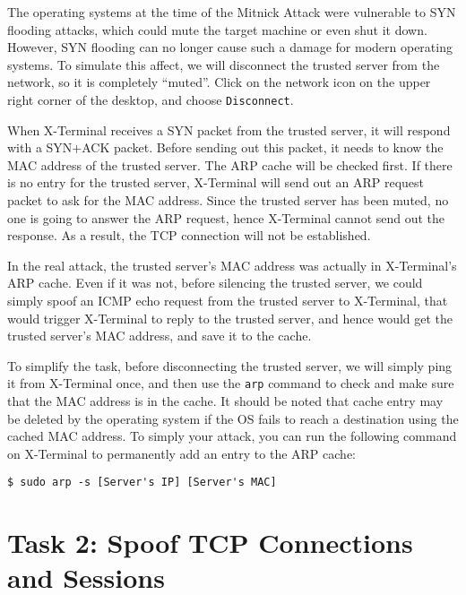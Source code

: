 The operating systems at the time of the Mitnick Attack were vulnerable to SYN
flooding attacks, which could mute the target machine or even shut it down. 
However, SYN flooding can no longer cause such a damage for modern operating systems. 
To simulate this affect, we will
disconnect the trusted server from the network, so it is completely ``muted''.
Click on the network icon on the upper right corner of the desktop,
and choose \texttt{Disconnect}. 

When X-Terminal receives a SYN packet from the trusted server, it will respond with
a SYN+ACK packet. Before sending out this packet, 
it needs to know the MAC address of the trusted server. 
The ARP cache will be checked first. If there is no entry
for the trusted server, X-Terminal will send out an ARP request packet 
to ask for the MAC address. Since the trusted server has been
muted, no one is going to answer the ARP request, hence 
X-Terminal cannot send out the response. As a result, the
TCP connection will not be established. 

In the real attack, the trusted server's MAC address was actually in X-Terminal's ARP
cache. Even if it was not, before silencing the trusted server, 
we could simply spoof an ICMP echo request from the trusted 
server to X-Terminal, that would trigger X-Terminal to reply to 
the trusted server, and hence would get the trusted server's MAC address, and 
save it to the cache. 


To simplify the task, before disconnecting the trusted server, 
we will simply ping it from X-Terminal once, and then use 
the \texttt{arp} command to check and make sure that
the MAC address is in the cache. It should be noted that 
cache entry may be deleted by the operating system if 
the OS fails to reach a destination using 
the cached MAC address. To simply your attack, 
you can run the following command on X-Terminal to
permanently add an entry to the ARP cache:

\begin{lstlisting}
$ sudo arp -s [Server's IP] [Server's MAC]
\end{lstlisting}




\section{Task 2: Spoof TCP Connections and \rsh Sessions}
\label{sec:task2}

